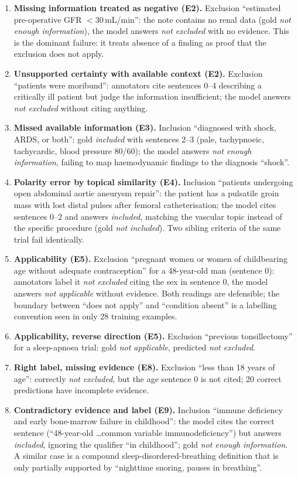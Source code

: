 \documentclass[conference]{IEEEtran}
\begin{document}
\begin{enumerate}
\item \textbf{Missing information treated as negative (E2).} Exclusion ``estimated pre-operative GFR $<$30\,mL/min'': the note contains no renal data (gold \emph{not enough information}), the model answers \emph{not excluded} with no evidence. This is the dominant failure: it treats absence of a finding as proof that the exclusion does not apply.
\item \textbf{Unsupported certainty with available context (E2).} Exclusion ``patients were moribund'': annotators cite sentences 0--4 describing a critically ill patient but judge the information insufficient; the model answers \emph{not excluded} without citing anything.
\item \textbf{Missed available information (E3).} Inclusion ``diagnosed with shock, ARDS, or both'': gold \emph{included} with sentences 2--3 (pale, tachypnoeic, tachycardic, blood pressure 80/60); the model answers \emph{not enough information}, failing to map haemodynamic findings to the diagnosis ``shock''.
\item \textbf{Polarity error by topical similarity (E4).} Inclusion ``patients undergoing open abdominal aortic aneurysm repair'': the patient has a pulsatile groin mass with lost distal pulses after femoral catheterisation; the model cites sentences 0--2 and answers \emph{included}, matching the vascular topic instead of the specific procedure (gold \emph{not included}). Two sibling criteria of the same trial fail identically.
\item \textbf{Applicability (E5).} Exclusion ``pregnant women or women of childbearing age without adequate contraception'' for a 48-year-old man (sentence 0): annotators label it \emph{not excluded} citing the sex in sentence 0, the model answers \emph{not applicable} without evidence. Both readings are defensible; the boundary between ``does not apply'' and ``condition absent'' is a labelling convention seen in only 28 training examples.
\item \textbf{Applicability, reverse direction (E5).} Exclusion ``previous tonsillectomy'' for a sleep-apnoea trial: gold \emph{not applicable}, predicted \emph{not excluded}.
\item \textbf{Right label, missing evidence (E8).} Exclusion ``less than 18 years of age'': correctly \emph{not excluded}, but the age sentence 0 is not cited; 20 correct predictions have incomplete evidence.
\item \textbf{Contradictory evidence and label (E9).} Inclusion ``immune deficiency and early bone-marrow failure in childhood'': the model cites the correct sentence (``48-year-old \dots common variable immunodeficiency'') but answers \emph{included}, ignoring the qualifier ``in childhood''; gold \emph{not enough information}. A similar case is a compound sleep-disordered-breathing definition that is only partially supported by ``nighttime snoring, pauses in breathing''.
\end{enumerate}
\end{document}

